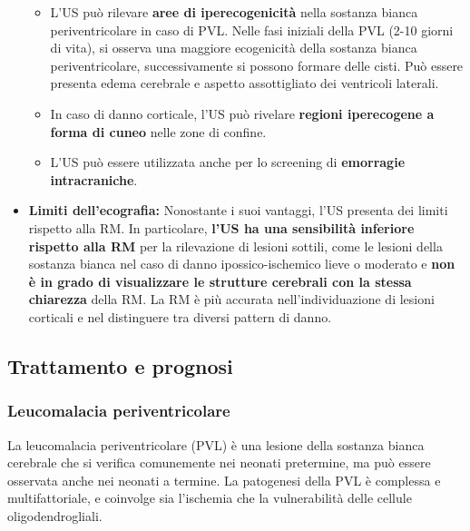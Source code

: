 \begin{itemize}
	\begin{itemize}
		\tightlist
		\item
		L'US può rilevare \textbf{aree di iperecogenicità} nella sostanza bianca periventricolare in caso di PVL. Nelle fasi iniziali della PVL (2-10 giorni di vita), si osserva una maggiore ecogenicità della sostanza bianca periventricolare, successivamente si possono formare delle cisti. Può essere presenta edema cerebrale e aspetto assottigliato dei ventricoli laterali.
		\item
		In caso di danno corticale, l'US può rivelare \textbf{regioni iperecogene a forma di cuneo} nelle zone di confine.
		\item
		L'US può essere utilizzata anche per lo screening di \textbf{emorragie intracraniche}.
	\end{itemize}
	\item
	\textbf{Limiti dell'ecografia:} Nonostante i suoi vantaggi, l'US presenta dei limiti rispetto alla RM. In particolare, \textbf{l'US ha una sensibilità inferiore rispetto alla RM} per la rilevazione di lesioni sottili, come le lesioni della sostanza bianca nel caso di danno ipossico-ischemico lieve o moderato e \textbf{non è in grado di visualizzare le strutture cerebrali con la stessa chiarezza} della RM. La RM è più accurata nell'individuazione di lesioni corticali e nel distinguere tra diversi pattern di danno.
\end{itemize}

\subsection{Trattamento e prognosi}

\subsubsection{Leucomalacia periventricolare}

La leucomalacia periventricolare (PVL) è una lesione della sostanza bianca cerebrale che si verifica comunemente nei neonati pretermine, ma può essere osservata anche nei neonati a termine. La patogenesi della PVL è complessa e multifattoriale, e coinvolge sia l'ischemia che la vulnerabilità delle cellule oligodendrogliali.

